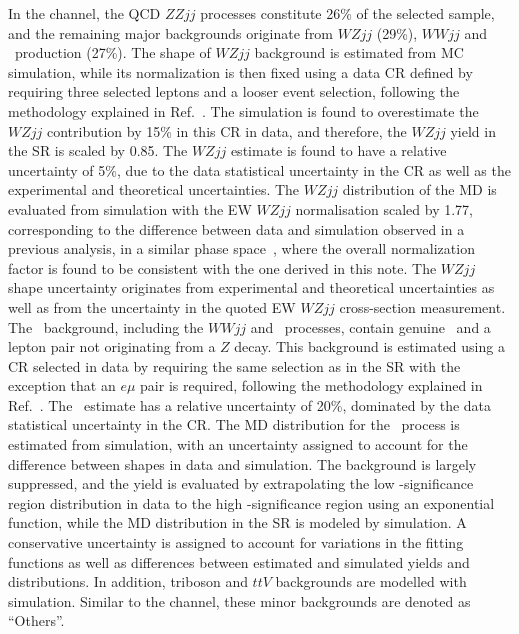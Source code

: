 In the \llvvjj channel, the QCD $ZZjj$ processes constitute 26\% of the selected sample,
and the remaining major backgrounds originate from $WZjj$ (29\%), $WWjj$ and \ttbar~production (27\%).
The shape of $WZjj$ background is estimated from MC simulation, 
while its normalization is then fixed using a data CR defined by requiring three selected leptons and a looser event selection, following the methodology explained in Ref.~\cite{Aaboud:2017bja}.
The simulation is found to overestimate the $WZjj$ contribution by 15\% in this CR in data,
and therefore, the $WZjj$ yield in the SR is scaled by 0.85.
The $WZjj$ estimate is found to have a relative uncertainty of 5\%, due to the data statistical uncertainty in the CR as well as the experimental and theoretical uncertainties.
The $WZjj$ distribution of the MD is evaluated from simulation with the EW $WZjj$ normalisation scaled by 1.77, corresponding to the difference between data and simulation observed in a previous analysis, in a similar phase space~\cite{Aaboud:2018ddq},
where the overall normalization factor is found to be consistent with the one derived in this note.
The $WZjj$ shape uncertainty originates from experimental and theoretical uncertainties as well as from the uncertainty in the quoted EW $WZjj$ cross-section measurement.
The \nonresll~background, including the $WWjj$ and \ttbar~processes, contain genuine \met~and a lepton pair not originating from a $Z$ decay.
This background is estimated using a CR selected in data by requiring the same selection as in the SR with the exception that an $e\mu$ pair is required, following the methodology explained in Ref.~\cite{Aaboud:2017bja}.
The \nonresll~estimate has a relative uncertainty of 20\%, dominated by the data statistical uncertainty in the CR.
The MD distribution for the \nonresll~process is estimated from simulation,
with an uncertainty assigned to account for the difference between shapes in data and simulation.
The \Zjet background is largely suppressed, and the yield is evaluated by extrapolating the low \met-significance region distribution in data to the high \met-significance region using an exponential function,
while the MD distribution in the SR is modeled by simulation.
A conservative uncertainty is assigned to account for variations in the fitting functions as well as differences between estimated and simulated yields and distributions.
In addition, triboson and $ttV$ backgrounds are modelled with simulation. Similar to the \lllljj channel, these minor backgrounds are denoted as ``Others''.

